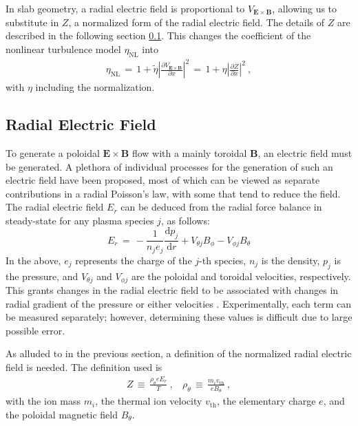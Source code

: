 In slab geometry, a radial electric field is proportional to $V_{\mathbf{E}\times\mathbf{B}}$, allowing us to substitute in $Z$, a normalized form of the radial electric field.
The details of $Z$ are described in the following section \ref{ssec:E_r}.
This changes the coefficient of the nonlinear turbulence model $\eta_\text{NL}$ into
\begin{align} %
	\eta_\text{NL} \,=\, 1 +
		\tilde{\eta} \left|\frac{\partial V_{\mathbf{E}\times\mathbf{B}}}{\partial x}\right|^2
		\,=\, 1 + \eta\left|\frac{\partial Z}{\partial x}\right|^2~,
	\label{eq:saturation_normalization}
\end{align}
with $\eta$ including the normalization.

\subsection{Radial Electric Field}\label{ssec:E_r}
To generate a poloidal $\mathbf{E}\times\mathbf{B}$ flow with a mainly toroidal $\mathbf{B}$, an electric field must be generated.
A plethora of individual processes for the generation of such an electric field have been proposed, most of which can be viewed as separate contributions in a radial Poisson's law, with some that tend to reduce the field.
The radial electric field $E_r$ can be deduced from the radial force balance in steady-state for any plasma species $j$, as follows:
\begin{equation} %
	E_r \,=\, -\frac{1}{n_j e_j} \frac{\text{d} p_j}{\text{d} r} + V_{\theta j} B_\phi - V_{\phi j} B_\theta
	\label{eq:E_r}
\end{equation}
In the above, $e_j$ represents the charge of the $j$-th species, $n_j$ is the density, $p_j$ is the pressure, and $V_{\theta j}$ and $V_{\phi j}$ are the poloidal and toroidal velocities, respectively.
This grants changes in the radial electric field to be associated with changes in radial gradient of the pressure or either velocities \cite{connor_review_2000}.
Experimentally, each term can be measured separately; however, determining these values is difficult due to large possible error.

As alluded to in the previous section, a definition of the normalized radial electric field is needed.
The definition used is
\begin{align} %
	Z \,\equiv\, \frac{\rho_\theta e E_r}{T}~, ~~~~
		\rho_\theta \,\equiv\, \frac{m_i v_\text{th}}{e B_\theta}~,\label{eq:Z_and_rho_definitions}
\end{align}
with the ion mass $m_i$, the thermal ion velocity $v_\text{th}$, the elementary charge $e$, and the poloidal magnetic field $B_\theta$.

